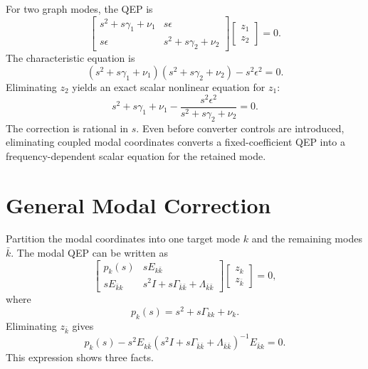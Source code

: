 For two graph modes, the QEP is
\begin{equation}
  \begin{bmatrix}
    s^2+s\gamma_1+\nu_1 & s\epsilon\\
    s\epsilon & s^2+s\gamma_2+\nu_2
  \end{bmatrix}
  \begin{bmatrix} z_1\\z_2\end{bmatrix}=0.
  \label{eq:two_mode_nonprop}
\end{equation}
The characteristic equation is
\begin{equation}
  (s^2+s\gamma_1+\nu_1)(s^2+s\gamma_2+\nu_2)-s^2\epsilon^2=0.
  \label{eq:two_mode_char}
\end{equation}
Eliminating \(z_2\) yields an exact scalar nonlinear equation for \(z_1\):
\begin{equation}
  s^2+s\gamma_1+\nu_1
  -
  \frac{s^2\epsilon^2}{s^2+s\gamma_2+\nu_2}
  =0.
  \label{eq:two_mode_rational}
\end{equation}
The correction is rational in \(s\). Even before converter controls are
introduced, eliminating coupled modal coordinates converts a fixed-coefficient
QEP into a frequency-dependent scalar equation for the retained mode.

\section{General Modal Correction}

Partition the modal coordinates into one target mode \(k\) and the remaining
modes \(\bar k\). The modal QEP can be written as
\begin{equation}
  \begin{bmatrix}
    p_k(s) & sE_{k\bar k}\\
    sE_{\bar k k} &
    s^2I+s\Gamma_{\bar k\bar k}+\Lambda_{\bar k\bar k}
  \end{bmatrix}
  \begin{bmatrix}
    z_k\\z_{\bar k}
  \end{bmatrix}=0,
  \label{eq:general_modal_partition}
\end{equation}
where
\begin{equation}
  p_k(s)=s^2+s\Gamma_{kk}+\nu_k.
\end{equation}
Eliminating \(z_{\bar k}\) gives
\begin{equation}
  p_k(s)
  -
  s^2E_{k\bar k}
  \left(s^2I+s\Gamma_{\bar k\bar k}+\Lambda_{\bar k\bar k}\right)^{-1}
  E_{\bar k k}
  =0.
  \label{eq:general_modal_correction}
\end{equation}
This expression shows three facts.

